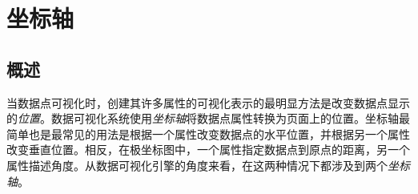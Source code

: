 %
%
%


\section{坐标轴}
\label{section-dv-axes}

\subsection{概述}


当数据点可视化时，创建其许多属性的可视化表示的最明显方法是改变数据点显示的\emph{位置}。数据可视化系统使用\emph{坐标轴}将数据点属性转换为页面上的位置。坐标轴最简单也是最常见的用法是根据一个属性改变数据点的水平位置，并根据另一个属性改变垂直位置。相反，在极坐标图中，一个属性指定数据点到原点的距离，另一个属性描述角度。从数据可视化引擎的角度来看，在这两种情况下都涉及到两个\emph{坐标轴}。


